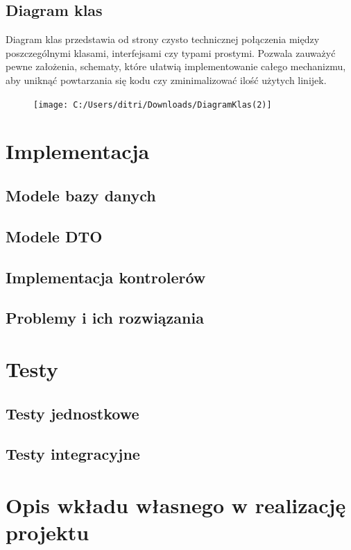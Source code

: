 \documentclass[12pt,a4paper]{article}
\begin{document}
\subsection{Diagram klas}
Diagram klas przedstawia od strony czysto technicznej połączenia między poszczególnymi klasami, interfejsami czy typami prostymi. Pozwala zauważyć pewne założenia, schematy, które ułatwią implementowanie całego mechanizmu, aby uniknąć powtarzania się kodu czy zminimalizować ilość użytych linijek. 

\begin{figure}[ht!]
	\centering
	\texttt{[image: C:/Users/ditri/Downloads/DiagramKlas(2)]}
	\caption{}
	\label{fig:diagramklas2}
\end{figure}

\section{Implementacja}

\subsection{Modele bazy danych}				%
\subsection{Modele DTO} 					%
\subsection{Implementacja kontrolerów}		%
\subsection{Problemy i ich rozwiązania}		%

\section{Testy}

\subsection{Testy jednostkowe}   %
\subsection{Testy integracyjne}  %

\section{Opis wkładu własnego w realizację projektu}
\end{document}
